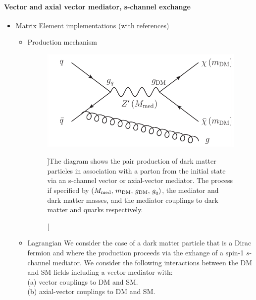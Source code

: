 \newcommand{\bra}[1]{\langle #1|}
\newcommand{\ket}[1]{|#1\rangle}
\newcommand{\MET}{\slashed{E}_T}
\newcommand{\mDM}{m_{\rm{DM}}}
\newcommand{\mMed}{M_{\rm{med}}}
\newcommand{\gDM}{g_{\rm{DM}}}
\newcommand{\gq}{g_q}
\paragraph{Vector and axial vector mediator, s-channel exchange}

\begin{itemize}
\item Matrix Element implementations (with references)
\begin{itemize}
 \item Production mechanism
\begin{figure}[t!]
\centering
\includegraphics[width=0.5\linewidth]{figures/monoLHC.pdf}
\caption[][\baselineskip]{The diagram shows the pair production of dark matter particles in association with a parton from the initial state via an s-channel vector or axial-vector mediator. The process if specified by ($\mMed ,\, \mDM ,\, \gDM ,\, \gq)$, the mediator and dark matter masses, and the mediator couplings to dark matter and quarks respectively.}
\label{fig:OP}
\end{figure}


 \item Lagrangian
We consider the case of a dark matter particle that is a Dirac fermion and where the production proceeds via the exhange of a spin-1 $s$-channel mediator. We consider the following interactions between the DM and SM fields including a vector mediator with:\\
(a) vector couplings to DM and SM.\\
(b) axial-vector couplings to DM and SM.\\


\end{itemize}
\end{itemize}
